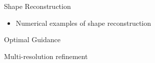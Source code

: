 \begin{frame}{Shape Reconstruction}
    \begin{itemize}
        \item Numerical examples of shape reconstruction
    \end{itemize}

\end{frame}

\begin{frame}{Optimal Guidance}

\end{frame}

\begin{frame}{Multi-resolution refinement}

\end{frame}
